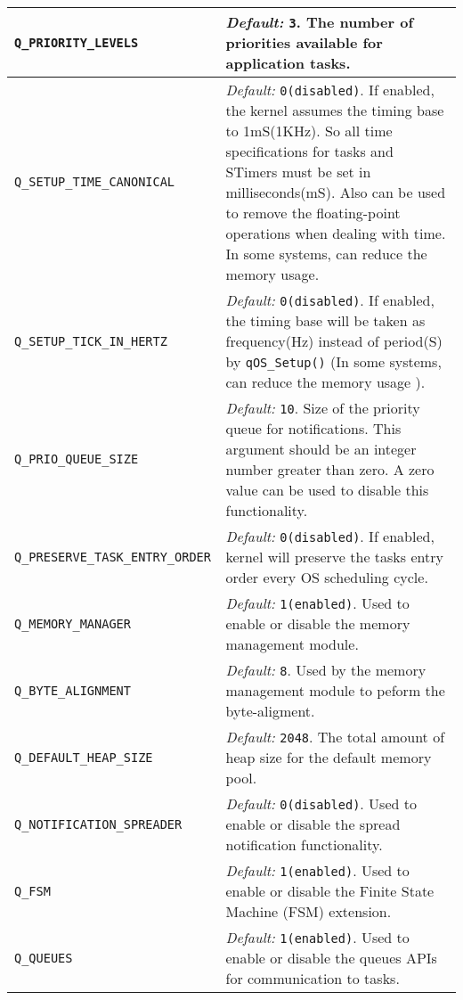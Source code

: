 \begin{adjustbox}{width=\textwidth,totalheight={18cm}}
\begin{tabularx}
{\textwidth}{l X}
\hline
{\lstinline!Q_PRIORITY_LEVELS!} & \textit{Default:} {\lstinline!3!}.  The number of priorities available for application tasks.\\
\hline
{\lstinline!Q_SETUP_TIME_CANONICAL!} & \textit{Default:}
{\lstinline!0(disabled)!}. If enabled, the kernel assumes the timing base to 1mS(1KHz). So all time specifications for tasks and STimers must be set in milliseconds(mS). Also can be used to remove the floating-point operations when dealing with time. In some systems, can reduce the memory usage. \\
\hline
{\lstinline!Q_SETUP_TICK_IN_HERTZ!} & \textit{Default:} {\lstinline!0(disabled)!}. If enabled, the timing base will be taken as frequency(Hz) instead of period(S) by {\lstinline!qOS_Setup()!} (In some systems, can reduce the memory usage ). \\
\hline
{\lstinline!Q_PRIO_QUEUE_SIZE!} & \textit{Default:} {\lstinline!10!}.  Size of the priority queue for notifications. This argument should be an integer number greater than zero. A zero value can be used to disable this functionality.\\
\hline
{\lstinline!Q_PRESERVE_TASK_ENTRY_ORDER !} & \textit{Default:} {\lstinline!0(disabled)!}. If enabled, kernel will preserve the tasks entry order every OS scheduling cycle.\\
\hline
{\lstinline!Q_MEMORY_MANAGER!} & \textit{Default:} {\lstinline!1(enabled)!}. Used to enable or disable the memory management module. \\
\hline
{\lstinline!Q_BYTE_ALIGNMENT!} & \textit{Default:} {\lstinline!8!}. Used by the memory management module to peform the byte-aligment. \\
\hline
{\lstinline!Q_DEFAULT_HEAP_SIZE!} & \textit{Default:} {\lstinline!2048!}. The total amount of heap size for the default memory pool. \\
\hline
{\lstinline!Q_NOTIFICATION_SPREADER!} & \textit{Default:} {\lstinline!0(disabled)!}. Used to enable or disable the spread notification functionality. \\
\hline
{\lstinline!Q_FSM!} & \textit{Default:} {\lstinline!1(enabled)!}.  Used to enable or disable the Finite State Machine (FSM) extension. \\
\hline
{\lstinline!Q_QUEUES!} & \textit{Default:} {\lstinline!1(enabled)!}.  Used to enable or disable the queues APIs for communication to tasks. \\

\end{tabularx}
\end{adjustbox}
